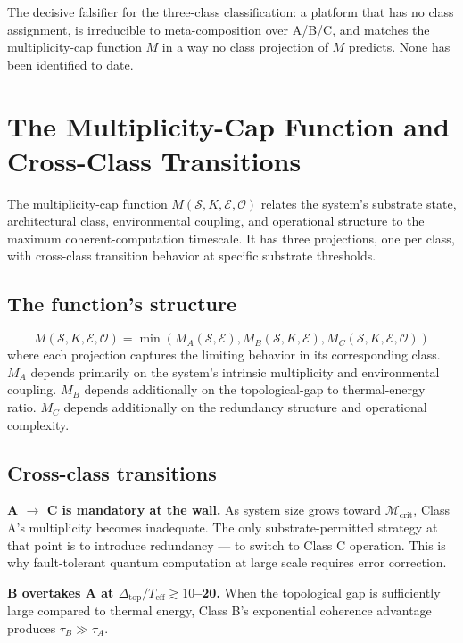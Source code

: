 \documentclass[11pt,a4paper]{article}
\begin{document}
The decisive falsifier for the three-class classification: a platform that has no class assignment, is irreducible to meta-composition over A/B/C, and matches the multiplicity-cap function $M$ in a way no class projection of $M$ predicts. None has been identified to date.

\section{The Multiplicity-Cap Function and Cross-Class Transitions}

The multiplicity-cap function $M(\mathcal{S}, K, \mathcal{E}, \mathcal{O})$ relates the system's substrate state, architectural class, environmental coupling, and operational structure to the maximum coherent-computation timescale. It has three projections, one per class, with cross-class transition behavior at specific substrate thresholds.

\subsection{The function's structure}

\[
M(\mathcal{S}, K, \mathcal{E}, \mathcal{O}) = \min(M_A(\mathcal{S}, \mathcal{E}), M_B(\mathcal{S}, K, \mathcal{E}), M_C(\mathcal{S}, K, \mathcal{E}, \mathcal{O}))
\]
where each projection captures the limiting behavior in its corresponding class. $M_A$ depends primarily on the system's intrinsic multiplicity and environmental coupling. $M_B$ depends additionally on the topological-gap to thermal-energy ratio. $M_C$ depends additionally on the redundancy structure and operational complexity.

\subsection{Cross-class transitions}

\textbf{A $\to$ C is mandatory at the wall.} As system size grows toward $\mathcal{M}_{\mathrm{crit}}$, Class A's multiplicity becomes inadequate. The only substrate-permitted strategy at that point is to introduce redundancy --- to switch to Class C operation. This is why fault-tolerant quantum computation at large scale requires error correction.

\textbf{B overtakes A at $\Delta_{\mathrm{top}}/T_{\mathrm{eff}} \gtrsim 10$--20.} When the topological gap is sufficiently large compared to thermal energy, Class B's exponential coherence advantage produces $\tau_B \gg \tau_A$.
\end{document}

